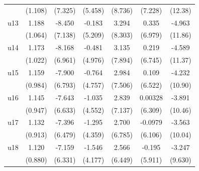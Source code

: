 \begin{table}[htbp]
\begin{tabular}{l*{6}{c}}
                    &     (1.108)         &     (7.325)         &     (5.458)         &     (8.736)         &     (7.228)         &     (12.38)         \\
\addlinespace
u13                 &       1.188         &      -8.450         &      -0.183         &       3.294         &       0.335         &      -4.963         \\
                    &     (1.064)         &     (7.138)         &     (5.209)         &     (8.303)         &     (6.979)         &     (11.86)         \\
\addlinespace
u14                 &       1.173         &      -8.168         &      -0.481         &       3.135         &       0.219         &      -4.589         \\
                    &     (1.022)         &     (6.961)         &     (4.976)         &     (7.894)         &     (6.745)         &     (11.37)         \\
\addlinespace
u15                 &       1.159         &      -7.900         &      -0.764         &       2.984         &       0.109         &      -4.232         \\
                    &     (0.984)         &     (6.793)         &     (4.757)         &     (7.506)         &     (6.522)         &     (10.90)         \\
\addlinespace
u16                 &       1.145         &      -7.643         &      -1.035         &       2.839         &     0.00328         &      -3.891         \\
                    &     (0.947)         &     (6.633)         &     (4.552)         &     (7.137)         &     (6.309)         &     (10.46)         \\
\addlinespace
u17                 &       1.132         &      -7.396         &      -1.295         &       2.700         &     -0.0979         &      -3.563         \\
                    &     (0.913)         &     (6.479)         &     (4.359)         &     (6.785)         &     (6.106)         &     (10.04)         \\
\addlinespace
u18                 &       1.120         &      -7.159         &      -1.546         &       2.566         &      -0.195         &      -3.247         \\
                    &     (0.880)         &     (6.331)         &     (4.177)         &     (6.449)         &     (5.911)         &     (9.630)         \\

\end{tabular}
\end{table}
